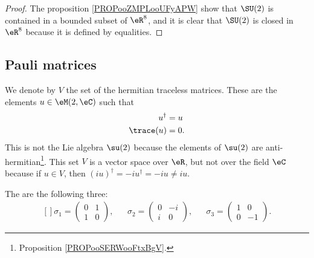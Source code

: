 \begin{proof}
    The proposition \ref{PROPooZMPLooUFyAPW} show that $\SU(2)$ is contained in a bounded subset of $\eR^8$, and it is clear that $\SU(2)$ is closed in $\eR^8$ because it is defined by equalities.
\end{proof}

\subsection{Pauli matrices}

We denote by \( V\) the set of the hermitian traceless matrices. These are the elements \( u\in \eM(2,\eC)\) such that
\begin{subequations}
    \begin{align}
        u^{\dag}&=u\\
        \trace(u)&=0.
    \end{align}
\end{subequations}
This is not the Lie algebra \( \su(2)\) because the elements of \( \su(2)\) are anti-hermitian\footnote{Proposition \ref{PROPooSERWooFtxBgV}.}. This set \( V\) is a vector space over \( \eR\), but not over the field \( \eC\) because if \( u\in V\), then \( (iu)^{\dag}=-iu^{\dag}=-iu\neq iu\).

\begin{definition}      \label{DEFooRNTDooTVkPtB}
    The  are the following three:
    \begin{equation}
        \begin{aligned}[]
            \sigma_1=\begin{pmatrix}
                0    &   1    \\ 
                1    &   0    
            \end{pmatrix},&&
            \sigma_2=\begin{pmatrix}
                0    &   -i    \\ 
                i    &   0    
            \end{pmatrix},&&
            \sigma_3=\begin{pmatrix}
                1    &   0    \\ 
                0    &   -1    
            \end{pmatrix}.
        \end{aligned}
    \end{equation}
\end{definition}

